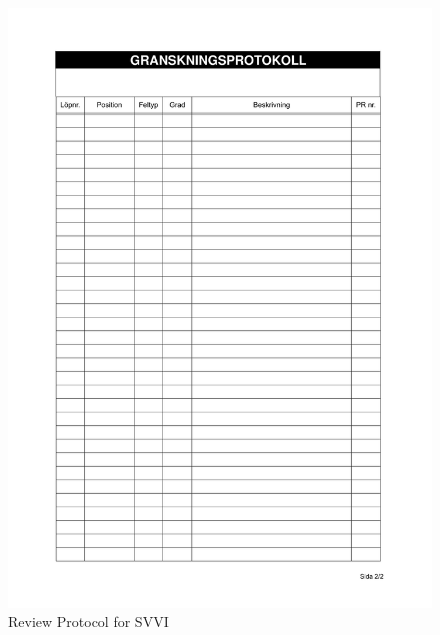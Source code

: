 \documentclass{article}
\begin{document}
 \begin{figure}
     \centering
     \includegraphics[width=13cm]{images/SVVI - Granskningsprotokoll-2}
     \renewcommand\figurename{Figure}
     \caption{Review Protocol for SVVI}
     \label{fig:my_label}
 \end{figure}
 
\end{document}
